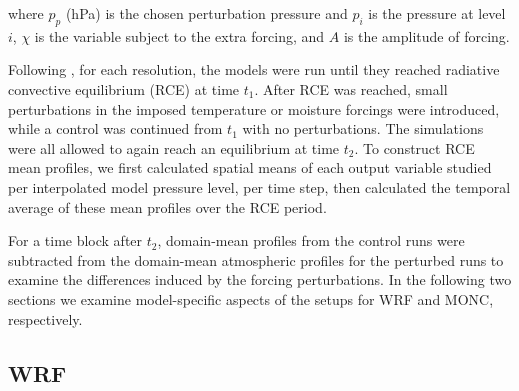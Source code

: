 \documentclass[draft]{agujournal2019}
\begin{document}
\noindent where $p_p$ (hPa) is the chosen perturbation pressure and $p_i$ is the
pressure at level $i$, $\chi$ is the variable subject to the extra forcing, and
$A$ is the amplitude of forcing. 

Following , for each resolution, the models were run until
they reached radiative convective equilibrium (RCE) at time $t_1$. After RCE was
reached, small perturbations in the imposed temperature or moisture forcings
were introduced, while a control was continued from $t_1$ with no perturbations.
The simulations were all allowed to again reach an equilibrium at time $t_2$. To
construct RCE mean profiles, we first calculated spatial means of each output
variable studied per interpolated model pressure level, per time step, then
calculated the temporal average of these mean profiles over the RCE period.

For a time block after $t_2$, domain-mean profiles from the control runs were
subtracted from the domain-mean atmospheric profiles for the perturbed runs to
examine the differences induced by the forcing perturbations. In the following
two sections we examine model-specific aspects of the setups for WRF and MONC,
respectively.

\subsection{WRF}
\end{document}
